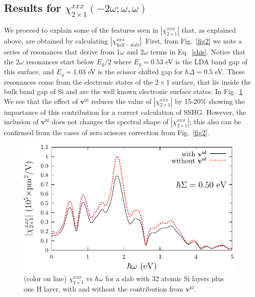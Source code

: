 \documentclass[floatfix,prb,aps,superscriptaddress,showpacs,letterpaper]{revtex4}
\begin{document}
\subsection{\texorpdfstring{Results for $\chi^{xxx}_{2\times 1}(-2\omega;\omega,\omega)$}
{Results for Xxxx(2x1)(-2w;w,w)}}

We proceed to explain 
some of the features seen in $|\chi^{xxx}_{2\times 1}|$ that, as
explained above, are obtained 
by calculating $|\chi^{xxx}_{\mathrm{half-slab}}|$.
First, from Fig.~\ref{fig2} we note a series of resonances 
that derive from 1$\omega$ and 2$\omega$ terms in
Eq.~\eqref{chis}. 
Notice that the 
2$\omega$ resonances start below $E_g/2$ where $E_g=0.53$ eV is the LDA
band gap of this surface, and $E_g=1.03$ eV is the scissor shifted gap for
$\hbar\Delta=0.5$ eV.
These resonances
come from the electronic states of the 
$2\times 1$ surface, that lie inside the bulk band gap of Si and are the 
well known electronic surface states.
In Fig.~\ref{fig3}
We see that the effect of $\mathbf{v}^\mathrm{nl}$
 reduces the value of   
$|\chi^{xxx}_{2\times 1}|$  
by 15-20\% 
showing the importance of this contribution for a correct calculation  
of SSHG.  
However, the inclusion of $\mathbf{v}^\mathrm{nl}$ does not
changes the 
spectral shape of $|\chi^{xxx}_{2\times 1}|$;
 this also can be confirmed from
the cases of zero scissors correction from Fig.~\ref{fig2}.
%
\begin{figure}
\centering 
\includegraphics[scale=.8]{plots/fig3}
\caption{(color on line) 
$\chi^{xxx}_{2\times 1}$
vs $\hbar\omega$ for a slab with 32 
atomic Si layers plus one H layer, 
with and without the contribution from $\mathbf{v}^\mathrm{nl}$.
\label{fig3}} 
\end{figure}
\end{document}
